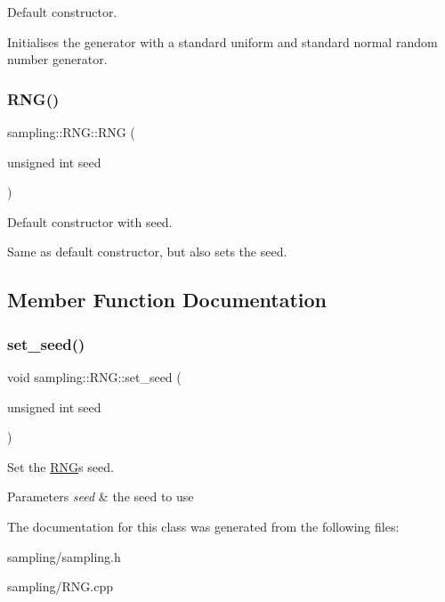 Default constructor.

Initialises the generator with a standard uniform and standard normal random number generator. \mbox{\label{classsampling_1_1RNG_a2fa1a6176fc0fbc96a5c4a4ead6d7927}} 
\subsubsection{\texorpdfstring{R\+N\+G()}{RNG()}\hspace{0.1cm}{\footnotesize\ttfamily [2/2]}}
{\footnotesize\ttfamily sampling\+::\+R\+N\+G\+::\+R\+NG (\begin{DoxyParamCaption}\item[{unsigned int}]{seed }\end{DoxyParamCaption})}

Default constructor with seed.

Same as default constructor, but also sets the seed. 

\subsection{Member Function Documentation}
\mbox{\label{classsampling_1_1RNG_ad739124235d7d9bbe31f86d37f2fb9e5}} 
\subsubsection{\texorpdfstring{set\+\_\+seed()}{set\_seed()}}
{\footnotesize\ttfamily void sampling\+::\+R\+N\+G\+::set\+\_\+seed (\begin{DoxyParamCaption}\item[{unsigned int}]{seed }\end{DoxyParamCaption})}

Set the \hyperlink{classsampling_1_1RNG}{R\+NG}\textquotesingle{}s seed. 
\begin{DoxyParams}{Parameters}
{\em seed} & the seed to use \\
\hline
\end{DoxyParams}


The documentation for this class was generated from the following files\+:\begin{DoxyCompactItemize}
\item 
sampling/sampling.\+h\item 
sampling/R\+N\+G.\+cpp\end{DoxyCompactItemize}
